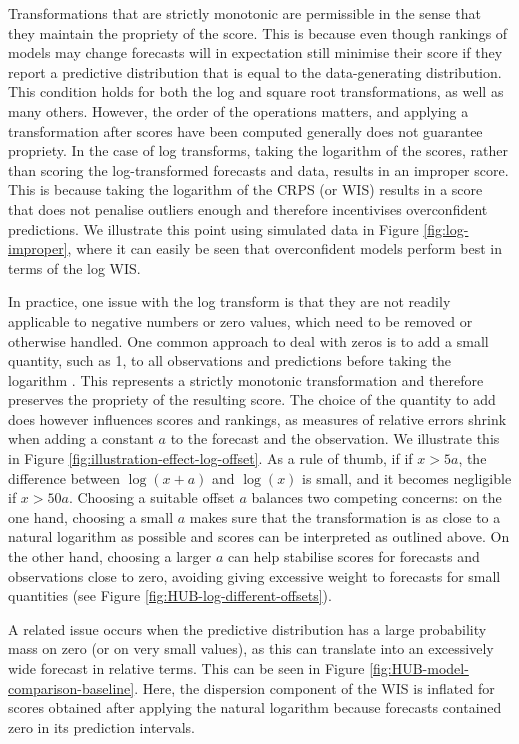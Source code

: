 \documentclass{article}
\begin{document}
Transformations that are strictly monotonic are permissible in the sense that they maintain the propriety of the score. This is because even though rankings of models may change forecasts will in expectation still minimise their score if they report a predictive distribution that is equal to the data-generating distribution. This condition holds for both the log and square root transformations, as well as many others. However, the order of the operations matters, and applying a transformation after scores have been computed generally does not guarantee propriety. In the case of log transforms, taking the logarithm of the scores, rather than scoring the log-transformed forecasts and data, results in an improper score. This is because taking the logarithm of the CRPS (or WIS) results in a score that does not penalise outliers enough and therefore incentivises overconfident predictions. We illustrate this point using simulated data in Figure \ref{fig:log-improper}, where it can easily be seen that overconfident models perform best in terms of the log WIS. 

In practice, one issue with the log transform is that they are not readily applicable to negative numbers or zero values, which need to be removed or otherwise handled. 
One common approach to deal with zeros is to add a small quantity, such as 1, to all observations and predictions before taking the logarithm \citep{bellegoDealingLogsZeros2022}. This represents a strictly monotonic transformation and therefore preserves the propriety of the resulting score. The choice of the quantity to add does however influences scores and rankings, as measures of relative errors shrink when adding a constant $a$ to the forecast and the observation. We illustrate this in Figure \ref{fig:illustration-effect-log-offset}. As a rule of thumb, if if $x > 5a$, the difference between $\log{(x + a)}$ and $\log{(x)}$ is small, and it becomes negligible if $x > 50a$. Choosing a suitable offset $a$ balances two competing concerns: on the one hand, choosing a small $a$ makes sure that the transformation is as close to a natural logarithm as possible and scores can be interpreted as outlined above. On the other hand, choosing a larger $a$ can help stabilise scores for forecasts and observations close to zero, avoiding giving excessive weight to forecasts for small quantities (see Figure \ref{fig:HUB-log-different-offsets}). 

A related issue occurs when the predictive distribution has a large probability mass on zero (or on very small values), as this can translate into an excessively wide forecast in relative terms. This can be seen in Figure \ref{fig:HUB-model-comparison-baseline}. Here, the dispersion component of the WIS is inflated for scores obtained after applying the natural logarithm because forecasts contained zero in its prediction intervals. 
\end{document}
